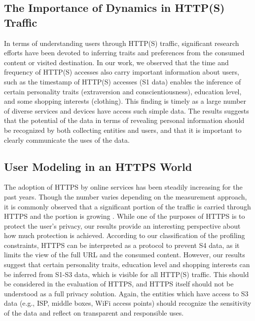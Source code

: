 \subsection{The Importance of Dynamics in HTTP(S) Traffic}
In terms of understanding users through HTTP(S) traffic, significant research efforts have been devoted to inferring traits and preferences from the consumed content or visited destination. In our work, we observed that the time and frequency of HTTP(S) accesses also carry important information about users, such as the timestamp of HTTP(S) accesses (S1 data) enables the inference of certain personality traits (extraversion and conscientiousness), education level, and some shopping interests (clothing). This finding is timely as a large number of diverse services and devices have access such simple data. The results suggests that the potential of the data in terms of revealing personal information should be recognized by both collecting entities and users, and that it is important to clearly communicate the uses of the data.

\subsection{User Modeling in an HTTPS World}
The adoption of HTTPS by online services has been steadily increasing for the past years. Though the number varies depending on the measurement approach, it is commonly observed that a significant portion of the traffic is carried through HTTPS and the portion is growing \cite{naylor2014cost}. While one of the purposes of HTTPS is to protect the user's privacy, our results provide an interesting perspective about how much protection is achieved. According to our classification of the profiling constraints, HTTPS can be interpreted as a protocol to prevent S4 data, as it limits the view of the full URL and the consumed content. However, our results suggest that certain personality traits, education level and shopping interests can be inferred from S1-S3 data, which is visible for all HTTP(S) traffic. This should be considered in the evaluation of HTTPS, and HTTPS itself should not be understood as a full privacy solution. Again, the entities which have access to S3 data (e.g., ISP, middle boxes, WiFi access points) should recognize the sensitivity of the data and reflect on transparent and responsible uses. 